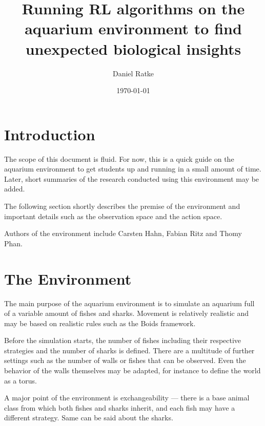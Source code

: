 \documentclass[12pt, letterpaper, fleqn, notitlepage]{article}
\title{Running RL algorithms on the aquarium environment to find unexpected biological insights}
\date{\today}
\author{Daniel Ratke}
\begin{document}
\maketitle

\section{Introduction}

The scope of this document is fluid. For now, this is a quick guide on the
aquarium environment to get students up and running in a small amount of time.
Later, short summaries of the research conducted using this environment may be
added.

The following section shortly describes the premise of the environment and
important details such as the observation space and the action space.

Authors of the environment include Carsten Hahn, Fabian Ritz and Thomy Phan.

\section{The Environment}

The main purpose of the aquarium environment is to simulate an aquarium full of
a variable amount of fishes and sharks. Movement is relatively realistic and
may be based on realistic rules such as the Boids framework.

Before the simulation starts, the number of fishes including their respective
strategies and the number of sharks is defined. There are a multitude of
further settings such as the number of walls or fishes that can be observed.
Even the behavior of the walls themselves may be adapted, for instance to
define the world as a torus.

A major point of the environment is exchangeability --- there is a base animal
class from which both fishes and sharks inherit, and each fish may have a
different strategy. Same can be said about the sharks.
\end{document}
